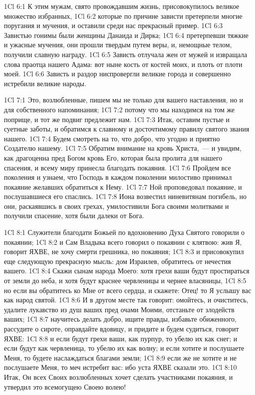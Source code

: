 \vs 1Cl 6:1
К этим мужам, свято
провождавшим жизнь, присовокупилось великое множество избранных,
\vs 1Cl 6:2
которые по причине зависти
претерпели многие поругания и мучения, и оставили среди нас прекрасный пример.
\vs 1Cl 6:3
Завистью гонимы были
женщины Данаида и Дирка;
\vs 1Cl 6:4
претерпевши тяжкие и
ужасные мучения, они прошли твердым путем веры, и, немощные телом, получили
славную награду.
\vs 1Cl 6:5
Зависть отлучала жен от
мужей и извращала слова праотца нашего Адама: вот ныне кость от костей моих,
и плоть от плоти моей.
\vs 1Cl 6:6
Зависть и раздор
ниспровергли великие города и совершенно истребили великие народы.

\vs 1Cl 7:1
Это, возлюбленные, пишем
мы не только для вашего наставления, но и для собственного напоминания;
\vs 1Cl 7:2
потому что мы находимся на
том же поприще, и тот же подвиг предлежит нам.
\vs 1Cl 7:3
Итак, оставим пустые и
суетные заботы, и обратимся к славному и досточтимому правилу святого звания
нашего.
\vs 1Cl 7:4
Будем смотреть на то, что
добро, что угодно и приятно Создателю нашему.
\vs 1Cl 7:5
Обратим внимание на кровь
Христа,~--- и увидим, как драгоценна пред Богом кровь Его, которая была пролита
для нашего спасения, и всему миру принесла благодать покаяния.
\vs 1Cl 7:6
Пройдем все поколения и
узнаем, что Господь в каждом поколении милостиво принимал покаяние желавших
обратиться к Нему.
\vs 1Cl 7:7
Ной проповедовал покаяние,
и послушавшиеся его спаслись.
\vs 1Cl 7:8
Иона возвестил ниневитянам
погибель, но они, раскаявшись в своих грехах, умилостивили Бога своими
молитвами и получили спасение, хотя были далеки от Бога.

\vs 1Cl 8:1
Служители благодати
Божьей по вдохновению Духа Святого говорили о покаянии;
\vs 1Cl 8:2
и Сам Владыка всего
говорил о покаянии с клятвою: жив Я, говорит ЯХВЕ, не хочу смерти грешника,
но покаяния;
\vs 1Cl 8:3
и присовокупил еще
следующую прекрасную мысль: дом Израилев, обратитесь от нечестия вашего.
\vs 1Cl 8:4
Скажи сынам народа Моего:
хотя грехи ваши будут простираться от земли до неба, и хотя будут краснее
червленицы и чернее власяницы,
\vs 1Cl 8:5
но если вы обратитесь ко
Мне от всего сердца, и скажете: Отец! то Я услышу вас как народ святой.
\vs 1Cl 8:6
И в другом месте так
говорит: омойтесь, и очиститесь, удалите лукавство из душ ваших пред очами
Моими, отстаньте от злодейств ваших;
\vs 1Cl 8:7
научитесь делать добро,
ищите правды, избавьте обиженного, рассудите о сироте, оправдайте вдовицу, и
придите и будем судиться, говорит ЯХВЕ:
\vs 1Cl 8:8
и если будут грехи ваши,
как пурпур, то убелю их как снег; и если будут как червленица, то убелю их как
волну; и если хотите и послушаете Меня, то будете наслаждаться благами земли;
\vs 1Cl 8:9
если же не хотите и не
послушаете Меня, то меч истребит вас: ибо уста ЯХВЕ сказали это.
\vs 1Cl 8:10
Итак, Он всех Своих
возлюбленных хочет сделать участниками покаяния, и утвердил это всемогущею
Своею волею!

